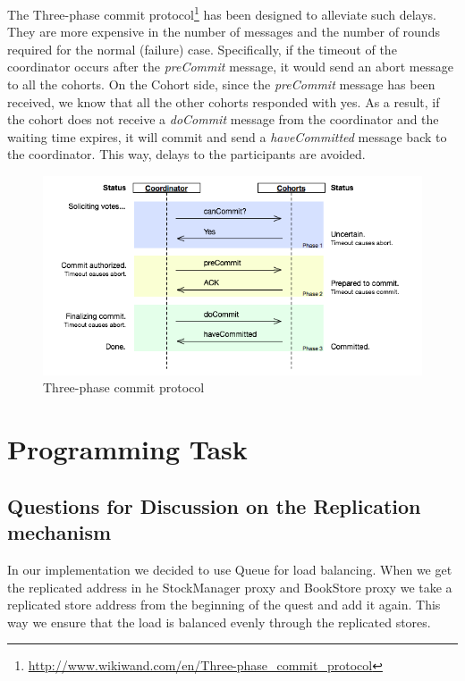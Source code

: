 \documentclass{article}      %
\begin{document}
The Three-phase commit protocol\footnote{\url{http://www.wikiwand.com/en/Three-phase_commit_protocol}} has been designed to alleviate such delays. They are more expensive in the number of messages and the number of rounds required for the normal (failure) case. Specifically, if the timeout of the coordinator occurs after the \emph{preCommit} message, it would send an abort message to all the cohorts. On the Cohort side, since the \emph{preCommit} message has been received, we know that all the other cohorts responded with yes. As a result, if the cohort does not receive a \emph{doCommit} message from the coordinator and the waiting time expires, it will commit and send a \emph{haveCommitted} message back to the coordinator. This way, delays to the participants are avoided.\\ 


\begin{figure}[ht]
\centering
 \includegraphics[scale=.5]{img/Three-phase_commit_diagram}
\caption{Three-phase commit protocol \label{overflow}}
\end{figure}

\section*{Programming Task}
\subsection*{Questions for Discussion on the Replication mechanism}

In our implementation we decided to use Queue for load balancing. When we get the replicated address in he StockManager proxy and BookStore proxy we take a replicated store address from the beginning of the quest and add it again. This way we ensure that the load is balanced evenly through the replicated stores.\\
\end{document}
